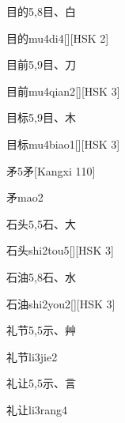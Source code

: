 \begin{entry}{目的}{5,8}{⽬、⽩}
  \begin{phonetics}{目的}{mu4di4}[][HSK 2]
  \end{phonetics}
\end{entry}

\begin{entry}{目前}{5,9}{⽬、⼑}
  \begin{phonetics}{目前}{mu4qian2}[][HSK 3]
  \end{phonetics}
\end{entry}

\begin{entry}{目标}{5,9}{⽬、⽊}
  \begin{phonetics}{目标}{mu4biao1}[][HSK 3]
  \end{phonetics}
\end{entry}

\begin{entry}{矛}{5}{⽭}[Kangxi 110]
  \begin{phonetics}{矛}{mao2}
  \end{phonetics}
\end{entry}

\begin{entry}{石头}{5,5}{⽯、⼤}
  \begin{phonetics}{石头}{shi2tou5}[][HSK 3]
  \end{phonetics}
\end{entry}

\begin{entry}{石油}{5,8}{⽯、⽔}
  \begin{phonetics}{石油}{shi2you2}[][HSK 3]
  \end{phonetics}
\end{entry}

\begin{entry}{礼节}{5,5}{⽰、⾋}
  \begin{phonetics}{礼节}{li3jie2}
  \end{phonetics}
\end{entry}

\begin{entry}{礼让}{5,5}{⽰、⾔}
  \begin{phonetics}{礼让}{li3rang4}
  \end{phonetics}
\end{entry}

